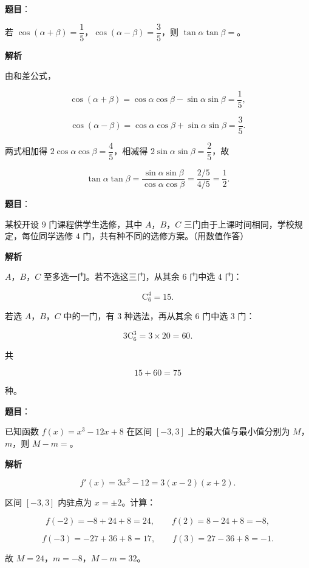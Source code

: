 \begin{answer}

\textbf{题目}：

若 $\cos(\alpha+\beta)=\dfrac15$，$\cos(\alpha-\beta)=\dfrac35$，则 $\tan\alpha\tan\beta=$\gkblank{}。

\textbf{解析}

由和差公式，

\nopagebreak[4]
\[\cos(\alpha+\beta)=\cos\alpha\cos\beta-\sin\alpha\sin\beta=\frac15,\]

\nopagebreak[4]
\[\cos(\alpha-\beta)=\cos\alpha\cos\beta+\sin\alpha\sin\beta=\frac35.\]

两式相加得 $2\cos\alpha\cos\beta=\dfrac45$，相减得 $2\sin\alpha\sin\beta=\dfrac25$，故

\nopagebreak[4]
\[\tan\alpha\tan\beta=\frac{\sin\alpha\sin\beta}{\cos\alpha\cos\beta}=\frac{2/5}{4/5}=\frac12.\]


\end{answer}
\begin{answer}

\textbf{题目}：

某校开设 $9$ 门课程供学生选修，其中 $A$，$B$，$C$ 三门由于上课时间相同，学校规定，每位同学选修 $4$ 门，共有\gkblank{}种不同的选修方案。（用数值作答）

\textbf{解析}

$A$，$B$，$C$ 至多选一门。若不选这三门，从其余 $6$ 门中选 $4$ 门：

\nopagebreak[4]
\[\mathrm C_6^4=15.\]

若选 $A$，$B$，$C$ 中的一门，有 $3$ 种选法，再从其余 $6$ 门中选 $3$ 门：

\nopagebreak[4]
\[3\mathrm C_6^3=3\times20=60.\]

共

\nopagebreak[4]
\[15+60=75\]

种。


\end{answer}
\begin{answer}

\textbf{题目}：

已知函数 $f(x)=x^3-12x+8$ 在区间 $[-3,3]$ 上的最大值与最小值分别为 $M$，$m$，则 $M-m=$\gkblank{}。

\textbf{解析}

\nopagebreak[4]
\[f'(x)=3x^2-12=3(x-2)(x+2).\]

区间 $[-3,3]$ 内驻点为 $x=\pm2$。计算：

\nopagebreak[4]
\[f(-2)=-8+24+8=24,\qquad f(2)=8-24+8=-8,\]

\nopagebreak[4]
\[f(-3)=-27+36+8=17,\qquad f(3)=27-36+8=-1.\]

故 $M=24$，$m=-8$，$M-m=32$。


\end{answer}
